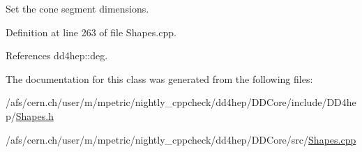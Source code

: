 Set the cone segment dimensions. 



Definition at line 263 of file Shapes.\+cpp.



References dd4hep\+::deg.



The documentation for this class was generated from the following files\+:\begin{DoxyCompactItemize}
\item 
/afs/cern.\+ch/user/m/mpetric/nightly\+\_\+cppcheck/dd4hep/\+D\+D\+Core/include/\+D\+D4hep/\hyperlink{_shapes_8h}{Shapes.\+h}\item 
/afs/cern.\+ch/user/m/mpetric/nightly\+\_\+cppcheck/dd4hep/\+D\+D\+Core/src/\hyperlink{_shapes_8cpp}{Shapes.\+cpp}\end{DoxyCompactItemize}
